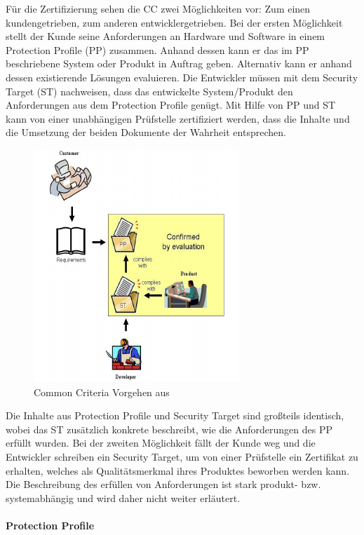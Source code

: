 \documentclass[11pt,a4paper]{report}
\begin{document}
Für die Zertifizierung sehen die CC zwei Möglichkeiten vor: Zum einen kundengetrieben, zum anderen entwicklergetrieben. Bei der ersten Möglichkeit stellt der Kunde seine Anforderungen an Hardware und Software in einem Protection Profile (PP) zusammen. Anhand dessen kann er das im PP beschriebene System oder Produkt in Auftrag geben. Alternativ kann er anhand dessen existierende Lösungen evaluieren. Die Entwickler müssen mit dem Security Target (ST) nachweisen, dass das entwickelte System/Produkt den Anforderungen aus dem Protection Profile genügt. Mit Hilfe von PP und ST kann von einer unabhängigen Prüfstelle zertifiziert werden, dass die Inhalte und die Umsetzung der beiden Dokumente der Wahrheit entsprechen.

\begin{figure}[htbp]
\centering
\includegraphics[scale=1.8]{images/cc_prozess.pdf}
\caption[]{Common Criteria Vorgehen aus \cite{bsi_ccguide}}
\label{fig:cc_prozess}
\end{figure}

Die Inhalte aus Protection Profile und Security Target sind großteils identisch, wobei das ST zusätzlich konkrete beschreibt, wie die Anforderungen des PP erfüllt wurden. Bei der zweiten Möglichkeit fällt der Kunde weg und die Entwickler schreiben ein Security Target, um von einer Prüfstelle ein Zertifikat zu erhalten, welches als Qualitätsmerkmal ihres Produktes beworben werden kann. Die Beschreibung des erfüllen von Anforderungen ist stark produkt- bzw. systemabhängig und wird daher nicht weiter erläutert.

\paragraph{Protection Profile}
\end{document}
